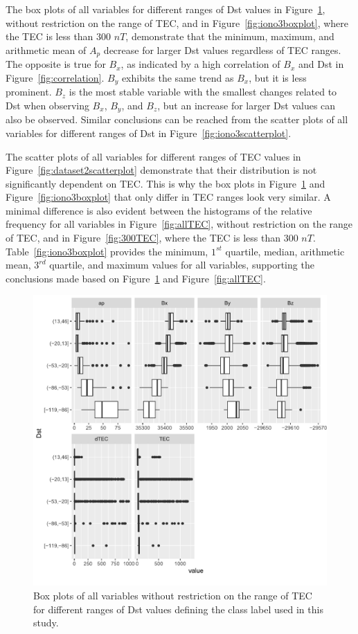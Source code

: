\documentclass[sn-mathphys-num]{sn-jnl}%
\begin{document}
The box plots of all variables for different ranges of Dst values in Figure~\ref{fig:dataset2boxplot}, without restriction on the range of TEC, and in Figure~\ref{fig:iono3boxplot}, where the TEC is less than $300$ $nT$, demonstrate that the minimum, maximum, and arithmetic mean of $A_{p}$ decrease for larger Dst values regardless of TEC ranges. The opposite is true for $B_{x}$, as indicated by a high correlation of $B_{x}$ and Dst in Figure~\ref{fig:correlation}. $B_{y}$ exhibits the same trend as $B_{x}$, but it is less prominent. $B_{z}$ is the most stable variable with the smallest changes related to Dst when observing $B_{x}$, $B_{y}$, and $B_{z}$, but an increase for larger Dst values can also be observed. Similar conclusions can be reached from the scatter plots of all variables for different ranges of Dst in Figure~\ref{fig:iono3scatterplot}. 

The scatter plots of all variables for different ranges of TEC values in Figure~\ref{fig:dataset2scatterplot} demonstrate that their distribution is not significantly dependent on TEC. This is why the box plots in Figure~\ref{fig:dataset2boxplot} and Figure~\ref{fig:iono3boxplot} that only differ in TEC ranges look very similar. A minimal difference is also evident between the histograms of the relative frequency for all variables in Figure~\ref{fig:allTEC}, without restriction on the range of TEC, and in Figure~\ref{fig:300TEC}, where the TEC is less than $300$ $nT$. Table~\ref{fig:iono3boxplot} provides the minimum, $1^{st}$ quartile, median, arithmetic mean, $3^{rd}$ quartile, and maximum values for all variables, supporting the conclusions made based on Figure~\ref{fig:dataset2boxplot} and Figure~\ref{fig:allTEC}.

\begin{figure}
    \centering
    \includegraphics[width=0.9\linewidth]{dataset2boxplot_fix.pdf}
    \caption{Box plots of all variables without restriction on the range of TEC for different ranges of Dst values defining the class label used in this study.}
    \label{fig:dataset2boxplot}
\end{figure}
\end{document}
